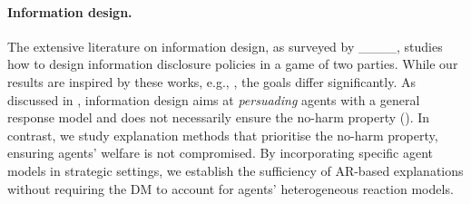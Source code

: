 \paragraph{Information design.} The extensive literature on information design, as surveyed by ____, studies how to design information disclosure policies in a game of two parties. While our results are inspired by these works, e.g., , the goals differ significantly. As discussed in , information design aims at \textit{persuading} agents with a general response model and does not necessarily ensure the no-harm property (). In contrast, we study explanation methods that prioritise the no-harm property, ensuring agents' welfare is not compromised.
By incorporating specific agent models in strategic settings, we establish the sufficiency of AR-based explanations without requiring the DM to account for agents' heterogeneous reaction models.

